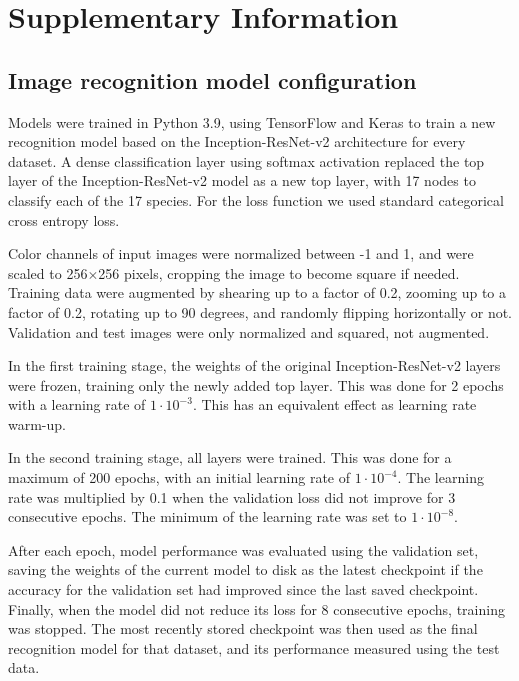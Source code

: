 \documentclass{article}
\begin{document}
\section*{Supplementary Information}

\subsection*{Image recognition model configuration}
\label{sec:model}
Models were trained in Python 3.9\autocite{python}, using TensorFlow\autocite{tensorflow} and Keras\autocite{keras} to train a new recognition model based on the Inception-ResNet-v2 architecture\autocite{szegedy2016inceptionv4} for every dataset. A dense classification layer using softmax activation replaced the top layer of the Inception-ResNet-v2 model as a new top layer, with 17 nodes to classify each of the 17 species. For the loss function we used standard categorical cross entropy loss.

Color channels of input images were normalized between -1 and 1, and were scaled to 256\(\times\)256 pixels, cropping the image to become square if needed. Training data were augmented by shearing up to a factor of 0.2, zooming up to a factor of 0.2, rotating up to 90 degrees, and randomly flipping horizontally or not. Validation and test images were only normalized and squared, not augmented.

In the first training stage, the weights of the original Inception-ResNet-v2 layers were frozen, training only the newly added top layer. This was done for 2 epochs with a learning rate of \(1\cdot10^{-3}\). This has an equivalent effect as learning rate warm-up.

In the second training stage, all layers were trained. This was done for a maximum of 200 epochs, with an initial learning rate of \(1\cdot10^{-4}\). The learning rate was multiplied by 0.1 when the validation loss did not improve for 3 consecutive epochs. The minimum of the learning rate was set to \(1\cdot10^{-8}\).

After each epoch, model performance was evaluated using the validation set, saving the weights of the current model to disk as the latest checkpoint if the accuracy for the validation set had improved since the last saved checkpoint. Finally, when the model did not reduce its loss for 8 consecutive epochs, training was stopped. The most recently stored checkpoint was then used as the final recognition model for that dataset, and its performance measured using the test data.
\end{document}
